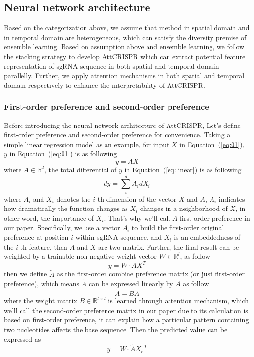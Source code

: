 \documentclass{bioinfo}
\begin{document}
\subsection{Neural network architecture}

Based on the categorization above, we assume that method in spatial domain and in temporal domain are heterogeneous, 
which can satisfy the diversity premise of ensemble learning. 
Based on assumption above and ensemble learning, we follow the stacking strategy to develop AttCRISPR 
which can extract potential feature representation of sgRNA sequence in both spatial and temporal domain parallelly. 
Further, we apply attention mechanisms in both spatial and temporal domain respectively to enhance the interpretability of AttCRISPR.

\subsubsection{First-order preference and second-order preference}

Before introducing the neural network architecture of AttCRISPR, Let's define first-order preference and second-order preference for convenience. 
Taking a simple linear regression model as an example, for input $X$ in Equation~(\ref{eq:01}), $y$ in Equation~(\ref{eq:01}) is as following
 \begin{equation}
y = AX\label{eq:linear}
\end{equation}
where $A \in\mathbb{R}^d$, the total differential of $y$ in Equation~(\ref{eq:linear}) is as following
 \begin{equation}
dy = \sum^{d}_iA_idX_i\label{eq:02}
\end{equation}
where $A_i$ and $X_i$ denotes the $i$-th dimension of the vector $X$ and $A$, 
$A_i$ indicates how dramatically the function changes as $X_i$ changes in a neighborhood of $X$, 
in other word, the importance of $X_i$. 
That's why we'll call $A$ first-order preference in our paper. 
Specifically, we use a vector $A_i$ to build the first-order original preference at position $i$ within sgRNA sequence, 
and $X_i$ is an embeddedness of the $i$-th feature, then $A$ and $X$ are two matrix. 
Further, the final result can be weighted by a trainable non-negative weight vector $W\in\mathbb{R}^l$, as follow
\begin{equation}
y=W \cdot AX^{T}\label{eq:superlinear}
\end{equation}
then we define $\tilde{A}$ as the first-order combine preference matrix (or just first-order preference), which means $\tilde{A}$ can be expressed linearly by $A$ as follow
\begin{equation}
\tilde{A}=BA\label{eq:04}
\end{equation}
where the weight matrix $B\in\mathbb{R}^{l\times l}$ is learned through attention mechanism, 
which we'll call the second-order preference matrix in our paper due to its calculation is based on first-order preference, 
it can explain how a particular pattern containing two nucleotides affects the base sequence. 
Then the predicted value can be expressed as
\begin{equation}
y=W \cdot \tilde{A} {X_e}^{T}\label{eq:05}
\end{equation}
\end{document}
